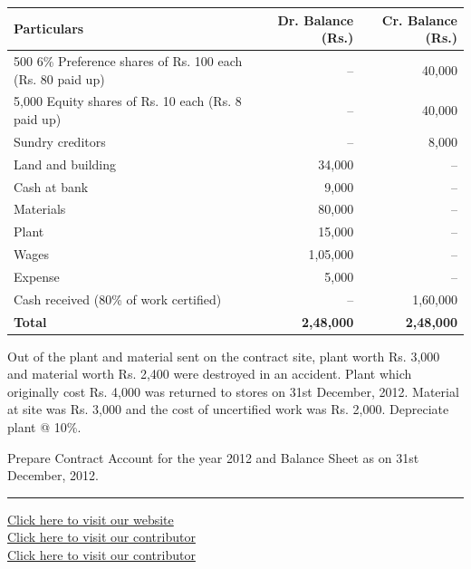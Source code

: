 \documentclass[11pt,a4paper]{article}
\begin{document}
\begin{center}
\renewcommand{\arraystretch}{1.2}

\begin{tabular}{|l|r|r|}
\hline
   \textbf{Particulars} &   \textbf{Dr. Balance (Rs.)} &   \textbf{Cr. Balance (Rs.)} \\ \hline
500 6\% Preference shares of Rs. 100 each (Rs. 80 paid up) & -- & 40,000 \\
5,000 Equity shares of Rs. 10 each (Rs. 8 paid up) & -- & 40,000 \\
Sundry creditors & -- & 8,000 \\
Land and building & 34,000 & -- \\
Cash at bank & 9,000 & -- \\
Materials & 80,000 & -- \\
Plant & 15,000 & -- \\
Wages & 1,05,000 & -- \\
Expense & 5,000 & -- \\
Cash received (80\% of work certified) & -- & 1,60,000 \\ \hline
   \textbf{Total} &   \textbf{2,48,000} &   \textbf{2,48,000} \\ \hline
\end{tabular}
\end{center}
Out of the plant and material sent on the contract site, plant worth Rs. 3,000 and material worth Rs. 2,400 were destroyed in an accident. Plant which originally cost Rs. 4,000 was returned to stores on 31st December, 2012. Material at site was Rs. 3,000 and the cost of uncertified work was Rs. 2,000. Depreciate plant @ 10\%.

Prepare Contract Account for the year 2012 and Balance Sheet as on 31st December, 2012.

\vfill
\rule{\linewidth}{0.4pt}

\begin{center}\small
\href{https://bhu-exam.vercel.app/}{Click here to visit our website}\\[4pt]
\href{https://me-aryan.vercel.app/}{Click here to visit our contributor}\\[4pt]
\href{https://quashan-me.vercel.app/}{Click here to visit our contributor}
\end{center}
\end{document}
